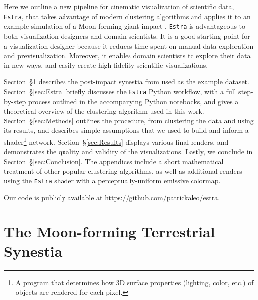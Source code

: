 \documentclass[fleqn,usenatbib,useAMS]{mnras}
\begin{document}
Here we outline a new pipeline for cinematic visualization of scientific data, \texttt{Estra}, that takes advantage of modern clustering algorithms and applies it to an example simulation of a Moon-forming giant impact \citep{Lock18}. \texttt{Estra} is advantageous to both visualization designers and domain scientists. It is a good starting point for a visualization designer because it reduces time spent on manual data exploration and previsualization. Moreover, it enables domain scientists to explore their data in new ways, and easily create high-fidelity scientific visualizations. \par
 
Section~\S \ref{sec:synestia} describes the post-impact synestia from \cite{Lock18} used as the example dataset. Section~\S \ref{sec:Estra} briefly discusses the \texttt{Estra} Python workflow, with a full step-by-step process outlined in the accompanying Python notebooks, and gives a theoretical overview of the clustering algorithm used in this work. Section~\S \ref{sec:Methods} outlines the procedure, from clustering the data and using its results, and describes simple assumptions that we used to build and inform a shader\footnote{A program that determines how 3D surface properties (lighting, color, etc.) of objects are rendered for each pixel.} network. Section~\S \ref{sec:Results} displays various final renders, and demonstrates the quality and validity of the visualizations. Lastly, we conclude in Section~\S \ref{sec:Conclusion}. The appendices include a short mathematical treatment of other popular clustering algorithms, as well as additional renders using the \texttt{Estra} shader with a perceptually-uniform emissive colormap. \par

Our code is publicly available at
\url{https://github.com/patrickaleo/estra}. \par

 
\section{The Moon-forming Terrestrial Synestia}\label{sec:synestia}

\end{document}
